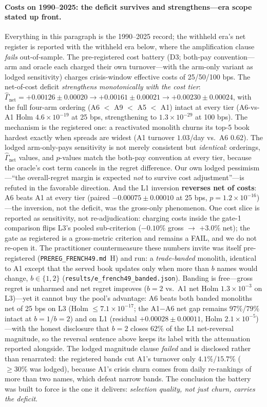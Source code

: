 \documentclass{article}
\begin{document}
\paragraph{Costs on 1990--2025: the deficit survives and
strengthens---era scope stated up front.} Everything in this
paragraph is the 1990--2025 record; the withheld era's net register
is reported with the withheld era below, where the amplification
clause \emph{fails} out-of-sample. The
pre-registered cost battery (D3; both-pay convention---arm and oracle
each charged their own turnover---with the arm-only variant as lodged
sensitivity) charges crisis-window effective costs of 25/50/100 bps.
The net-of-cost deficit \emph{strengthens monotonically with the cost
tier}: $\hat\Gamma_{\mathrm{net}} = +0.00126 \pm 0.00020 \to +0.00161
\pm 0.00021 \to +0.00230 \pm 0.00024$, with the full four-arm ordering
(A6 $<$ A9 $<$ A5 $<$ A1) intact at every tier
(A6-vs-A1 Holm $4.6\times10^{-19}$ at 25 bps, strengthening to
$1.3\times10^{-29}$ at 100 bps). The mechanism is the registered one: a
reactivated monolith churns its top-5 book hardest exactly when spreads
are widest (A1 turnover $1.03$/day vs.\ A6 $0.62$). The lodged
arm-only-pays sensitivity is not merely consistent but \emph{identical}:
orderings, $\hat\Gamma_{\mathrm{net}}$ values, and $p$-values match the
both-pay convention at every tier, because the oracle's cost term
cancels in the regret difference. Our own lodged
pessimism---``the overall-regret margin is expected \emph{not} to
survive cost adjustment''---is refuted in the favorable direction. And
the L1 inversion \textbf{reverses net of costs}: A6 beats A1 at every
tier (paired $-0.00075 \pm 0.00010$ at 25 bps, $p = 1.2\times10^{-16}$)
---the inversion, not the deficit, was the gross-only phenomenon. One
cost slice is reported as sensitivity, not re-adjudication: charging
costs inside the gate-1 comparison flips L3's pooled sub-criterion
($-0.10\%$ gross $\to$ $+3.0\%$ net); the gate as registered is a
gross-metric criterion and remains a FAIL, and we do not re-open it.
The practitioner countermeasure these numbers invite was itself
pre-registered (\texttt{PREREG\_FRENCH49.md}~H) and run: a
\emph{trade-banded} monolith,
identical to A1 except that the served book updates only when more
than $b$ names would change, $b \in \{1, 2\}$
(\texttt{results/e\_french49\_banded.json}). Banding is free---gross
regret is unharmed and net regret improves ($b{=}2$ vs.\ A1 net Holm
$1.3\times10^{-3}$ on L3)---yet it cannot buy the pool's advantage:
A6 beats both banded monoliths net of 25 bps on L3 (Holm
$\le 7.1\times10^{-17}$; the A1$-$A6 net gap remains $97\%$/$79\%$
intact at $b{=}1$/$b{=}2$) and on L1 (residual
$+0.00028 \pm 0.00011$, Holm $2.1\times10^{-5}$)---with the honest
disclosure that $b{=}2$ closes $62\%$ of the L1 net-reversal
magnitude, so the reversal sentence above keeps its label with the
attenuation reported alongside. The lodged magnitude clause
\emph{failed} and is disclosed rather than renarrated: the registered
bands cut A1's turnover only $4.1\%$/$15.7\%$ (${\ge}30\%$ was
lodged), because A1's crisis churn comes from daily re-rankings of
more than two names, which defeat narrow bands. The conclusion the
battery was built to force is the one it delivers: \emph{selection
quality, not just churn, carries the deficit}.
\end{document}
